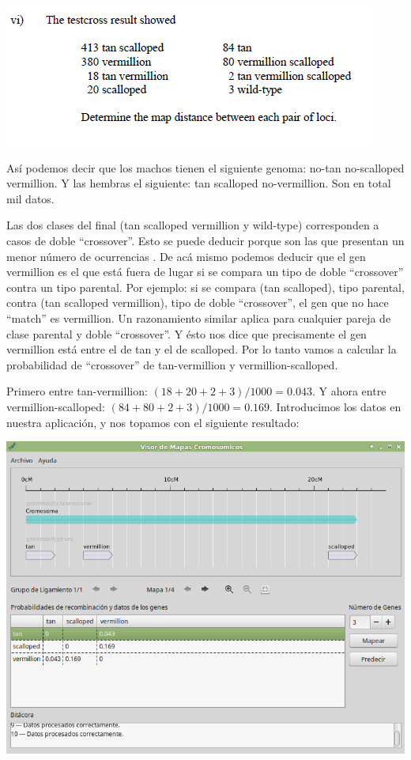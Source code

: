 \documentclass{article}
\begin{document}
	\begin{center}
		\includegraphics[scale=0.8]{images/e_5.png}
	\end{center}
	
	Así podemos decir que los machos tienen el siguiente genoma: no-tan no-scalloped vermillion. Y las hembras el siguiente: tan scalloped no-vermillion. Son en total mil datos.
	                                                     
	Las dos clases del final (tan scalloped vermillion y wild-type) corresponden a casos de doble ``crossover''. Esto se puede deducir porque son las que presentan un menor número de ocurrencias  \cite{carrinnes2003handbook}. De acá mismo podemos deducir que el gen vermillion es el que está fuera de lugar si se compara un tipo de doble ``crossover'' contra un tipo parental. Por ejemplo: si se compara (tan scalloped), tipo parental, contra (tan scalloped vermillion), tipo de doble ``crossover'', el gen que no hace ``match'' es vermillion. Un razonamiento similar aplica para cualquier pareja de clase parental y doble ``crossover''. Y ésto nos dice que precisamente el gen vermillion está entre el de tan y el de scalloped. Por lo tanto vamos a calcular la probabilidad de ``crossover'' de tan-vermillion y vermillion-scalloped.
	
	Primero entre tan-vermillion: $(18 + 20 + 2 + 3) / 1000 = 0.043$. Y ahora entre vermillion-scalloped: $(84 + 80 + 2 + 3) / 1000 = 0.169$. Introducimos los datos en nuestra aplicación, y nos topamos con el siguiente resultado:
	
	\begin{center}
		\includegraphics[scale=0.5]{images/e_6.png}
	\end{center}
	
\end{document}
